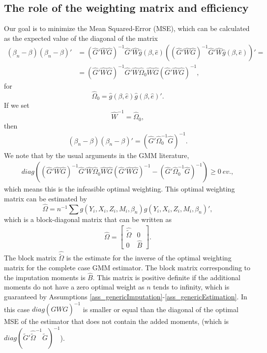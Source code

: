 \documentclass{article}
\theoremstyle{definition}
\theoremstyle{remark}
\begin{document}
\subsection{The role of the weighting matrix and efficiency}
Our goal is to minimize the Mean Squared-Error (MSE), which can be calculated as the expected value of the diagonal of the matrix
\begin{align}
(\beta_n -\beta)(\beta_n -\beta)'&=(\hat{G}'\hat{W}\hat{G})^{-1}\hat{G}'\hat{W}\hat{g}(\beta, \hat{e})((\hat{G}'\hat{W}\hat{G})^{-1}\hat{G}'\hat{W}\hat{g}(\beta, \hat{e}))'= \\
&= (\hat{G}'\hat{W}\hat{G})^{-1} \hat{G}'\hat{W} \hat{\Omega}_0 \hat{W} \hat{G} (\hat{G}'\hat{W}\hat{G})^{-1}, \nonumber
\end{align}
for
\[\hat{\Omega}_0 = \hat{g}(\beta, \hat{e}) \hat{g}(\beta, \hat{e})'.
\]
If we set
\[\hat{W}^{-1}=\hat{\Omega}_0,
\]
then
\begin{align}
(\beta_n -\beta)(\beta_n -\beta)'= \left(\hat{G}'\hat{\Omega}_0^{-1} \hat{G}\right)^{-1}.
\end{align}
We note that by the usual arguments in the GMM literature,
\begin{align}
diag\left((\hat{G}'\hat{W}\hat{G})^{-1} \hat{G}'\hat{W} \hat{\Omega}_0 \hat{W} \hat{G} (\hat{G}'\hat{W}\hat{G})^{-1}-  (\hat{G}'\hat{\Omega}_0^{-1} \hat{G})^{-1}\right)\geq 0 \ ev.,
\end{align}
which means this is the infeasible optimal weighting. This optimal weighting matrix can be estimated by
\[\hat{\Omega} = n^{-1}\sum g(Y_i, X_i, Z_i, M_i,\beta_n) g(Y_i, X_i, Z_i, M_i,\beta_n)',
\]
which is a block-diagonal matrix that can be written as
\begin{align}
\hat{\Omega} = \left[\begin{array}{cc}
\hat{\tilde{\Omega}} & 0 \\ 0 & \hat{B}
\end{array}\right].
\end{align}
The block matrix $\hat{\tilde{\Omega}}$ is the estimate for the inverse of the optimal weighting matrix for the complete case GMM estimator. The block matrix corresponding to the imputation moments is $\hat{B}$. This matrix is positive definite if the additional moments do not have a zero optimal weight as $n$ tends to infinity, which is guaranteed by Assumptions \ref{ass_genericImputation}-\ref{ass_genericEstimation}. In this case $diag(G\hat{W}G)^{-1}$ is smaller or equal than the diagonal of the optimal MSE of the estimator that does not contain the added moments, (which is $diag(\tilde{G}'\hat{\tilde{\Omega}}^{-1} \tilde{G})^{-1}$).
\end{document}
